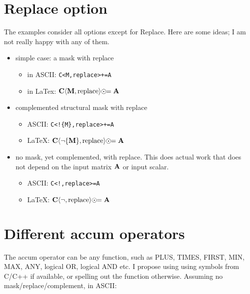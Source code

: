\documentclass[11pt]{article}
\begin{document}
\newpage

\section{Replace option}

The examples consider all options except for Replace.
Here are some ideas; I am not really happy with any of them.

\begin{itemize}

\item simple case: a mask with replace

    \begin{itemize}
    \item[] in ASCII: \verb'C<M,replace>+=A'
    \item[] in LaTex: $\bf C \langle M, \mbox{replace} \rangle \odot\!\!= A $
    \end{itemize}

\item complemented structural mask with replace

    \begin{itemize}
    \item[] ASCII: \verb'C<!{M},replace>+=A'
    \item[] LaTeX: ${\bf C} \langle \neg \{{\bf M}\}, \mbox{replace}
    \rangle \odot\!\!= {\bf A}$
    \end{itemize}

\item no mask, yet complemented, with replace.  This does actual work that
does not depend on the input matrix $\bf A$ or input scalar.

    \begin{itemize}
    \item[] ASCII: \verb'C<!,replace>=A'
    \item[] LaTeX: ${\bf C} \langle \neg, \mbox{replace}
    \rangle \odot\!\!= {\bf A}$
    \end{itemize}

\end{itemize}

\section{Different accum operators}

The accum operator can be any function, such as PLUS, TIMES, FIRST, MIN, MAX,
ANY, logical OR, logical AND etc.  I propose using using symbols from C/C++ if 
available, or spelling out the function otherwise.
Assuming no mask/replace/complement, in ASCII:
\end{document}
